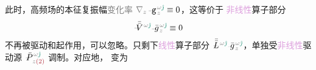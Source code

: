 此时，\textcolor{NavyBlue}{高频场}的\textcolor{PineGreen}{本征复振幅}\textcolor{gray}{变化率} $\mathcolor{gray}{\nabla_z} \xint{\begin{smallmatrix} ~ \\ {}^{}_{\mathcolor{gray}{-}} \\ ~ \end{smallmatrix}}{09}{\mathtt{g}}^{\;\!\mathcolor{gray}{\omega} \textcolor{PineGreen}{\hat{\jmath}}}_{\;\! \mathcolor{gray}{z}} \equiv 0$，这等价于 \textcolor{Plum}{非线性}算子部分
\begin{align} \label{eq:nonlinear(2)-wave_wkrho-EO-spectrum-V}
 \xint{\mathcolor{gray}{-}}{21}{\bar{\bar{V}}}^{\;\! \mathcolor{gray}{\omega} \textcolor{PineGreen}{\hat{\jmath}}} \xint{{}^{}_{\mathcolor{gray}{-}}}{10}{\bar{g}}^{\;\!\mathcolor{gray}{\omega} \textcolor{PineGreen}{\hat{\jmath}}}_{\;\! \mathcolor{gray}{z}} \equiv 0
\end{align} 
不再被驱动和起作用，可以忽略。只剩下\textcolor{Plum}{线性}算子部分 $\xint{\mathcolor{gray}{-}}{30}{\bar{\bar{L}}}^{\;\! \mathcolor{gray}{\omega} \textcolor{PineGreen}{\hat{\jmath}}} \xint{{}^{}_{\mathcolor{gray}{-}}}{10}{\bar{g}}^{\;\!\mathcolor{gray}{\omega} \textcolor{PineGreen}{\hat{\jmath}}}_{\;\! \mathcolor{gray}{z}}$，单独受\textcolor{Plum}{非线性}\textcolor{NavyBlue}{驱动源} $\xint{\mathcolor{gray}{-}}{25}{\bar{P}}^{\;\! \mathcolor{gray}{\omega} \textcolor{PineGreen}{\hat{\jmath}}}_{\;\! \mathcolor{gray}{z} \textcolor{Maroon}{(2)}}$ 调制。对应地， 变为
